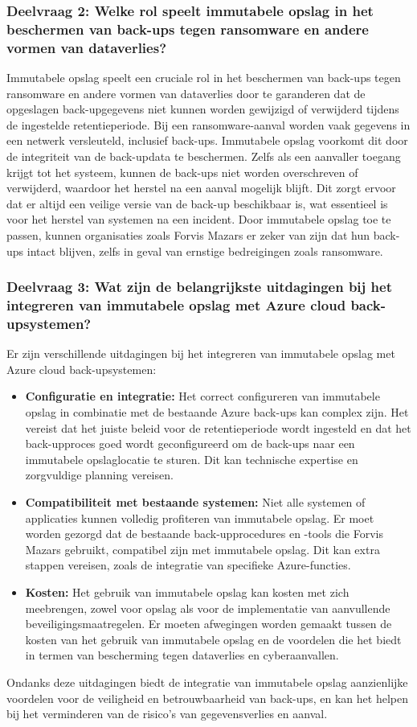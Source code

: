 \subsubsection{Deelvraag 2: Welke rol speelt immutabele opslag in het beschermen van back-ups tegen ransomware en andere vormen van dataverlies?}

Immutabele opslag speelt een cruciale rol in het beschermen van back-ups tegen ransomware en andere vormen van dataverlies door te garanderen dat de opgeslagen back-upgegevens niet kunnen worden gewijzigd of verwijderd tijdens de ingestelde retentieperiode. Bij een ransomware-aanval worden vaak gegevens in een netwerk versleuteld, inclusief back-ups. Immutabele opslag voorkomt dit door de integriteit van de back-updata te beschermen. Zelfs als een aanvaller toegang krijgt tot het systeem, kunnen de back-ups niet worden overschreven of verwijderd, waardoor het herstel na een aanval mogelijk blijft. Dit zorgt ervoor dat er altijd een veilige versie van de back-up beschikbaar is, wat essentieel is voor het herstel van systemen na een incident. Door immutabele opslag toe te passen, kunnen organisaties zoals Forvis Mazars er zeker van zijn dat hun back-ups intact blijven, zelfs in geval van ernstige bedreigingen zoals ransomware.

\subsubsection{Deelvraag 3: Wat zijn de belangrijkste uitdagingen bij het integreren van immutabele opslag met Azure cloud back-upsystemen?}

Er zijn verschillende uitdagingen bij het integreren van immutabele opslag met Azure cloud back-upsystemen:

\begin{itemize}
    \item \textbf{Configuratie en integratie:} Het correct configureren van immutabele opslag in combinatie met de bestaande Azure back-ups kan complex zijn. Het vereist dat het juiste beleid voor de retentieperiode wordt ingesteld en dat het back-upproces goed wordt geconfigureerd om de back-ups naar een immutabele opslaglocatie te sturen. Dit kan technische expertise en zorgvuldige planning vereisen.
    \item \textbf{Compatibiliteit met bestaande systemen:} Niet alle systemen of applicaties kunnen volledig profiteren van immutabele opslag. Er moet worden gezorgd dat de bestaande back-upprocedures en -tools die Forvis Mazars gebruikt, compatibel zijn met immutabele opslag. Dit kan extra stappen vereisen, zoals de integratie van specifieke Azure-functies.
    \item \textbf{Kosten:} Het gebruik van immutabele opslag kan kosten met zich meebrengen, zowel voor opslag als voor de implementatie van aanvullende beveiligingsmaatregelen. Er moeten afwegingen worden gemaakt tussen de kosten van het gebruik van immutabele opslag en de voordelen die het biedt in termen van bescherming tegen dataverlies en cyberaanvallen.
\end{itemize}


Ondanks deze uitdagingen biedt de integratie van immutabele opslag aanzienlijke voordelen voor de veiligheid en betrouwbaarheid van back-ups, en kan het helpen bij het verminderen van de risico's van gegevensverlies en aanval.
